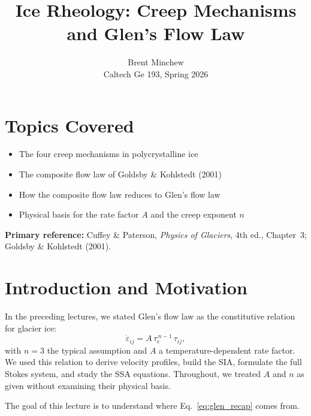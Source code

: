 \documentclass[11pt]{article}
\title{Ice Rheology: Creep Mechanisms and Glen's Flow Law}
\author{Brent Minchew \\Caltech Ge 193, Spring 2026}
\date{}
\begin{document}
\maketitle

\section*{Topics Covered}

\begin{itemize}
  \item The four creep mechanisms in polycrystalline ice
  \item The composite flow law of Goldsby \& Kohlstedt (2001)
  \item How the composite flow law reduces to Glen's flow law
  \item Physical basis for the rate factor $A$ and the creep exponent $n$
\end{itemize}

\noindent\textbf{Primary reference:} Cuffey \& Paterson, \textit{Physics of Glaciers}, 4th ed., Chapter~3; Goldsby \& Kohlstedt (2001).

\section{Introduction and Motivation}

In the preceding lectures, we stated Glen's flow law as the constitutive relation for glacier ice:
\begin{equation}
  \dot{\varepsilon}_{ij} = A\,\tau_e^{\,n-1}\,\tau_{ij},
  \label{eq:glen_recap}
\end{equation}
with $n = 3$ the typical assumption and $A$ a temperature-dependent rate factor.  We used this relation to derive velocity profiles, build the SIA, formulate the full Stokes system, and study the SSA equations.  Throughout, we treated $A$ and $n$ as given without examining their physical basis.

\medskip
\noindent The goal of this lecture is to understand where Eq.~\ref{eq:glen_recap} comes from.  
\medskip
\end{document}
